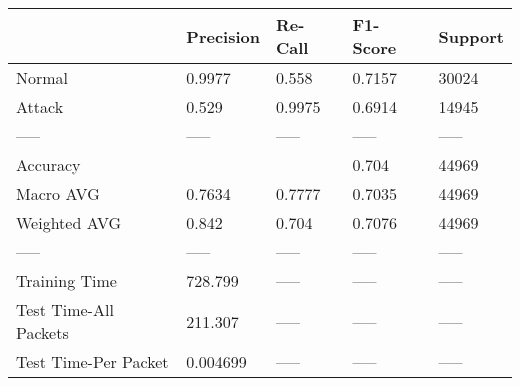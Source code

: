 \begin{tabular}{lllll}
\toprule
{} & Precision & Re-Call & F1-Score & Support \\
\midrule
Normal                &    0.9977 &   0.558 &   0.7157 &   30024 \\
Attack                &     0.529 &  0.9975 &   0.6914 &   14945 \\
-----                 &     ----- &   ----- &    ----- &   ----- \\
Accuracy              &           &         &    0.704 &   44969 \\
Macro AVG             &    0.7634 &  0.7777 &   0.7035 &   44969 \\
Weighted AVG          &     0.842 &   0.704 &   0.7076 &   44969 \\
-----                 &     ----- &   ----- &    ----- &   ----- \\
Training Time         &   728.799 &   ----- &    ----- &   ----- \\
Test Time-All Packets &   211.307 &   ----- &    ----- &   ----- \\
Test Time-Per Packet  &  0.004699 &   ----- &    ----- &   ----- \\
\bottomrule
\end{tabular}
